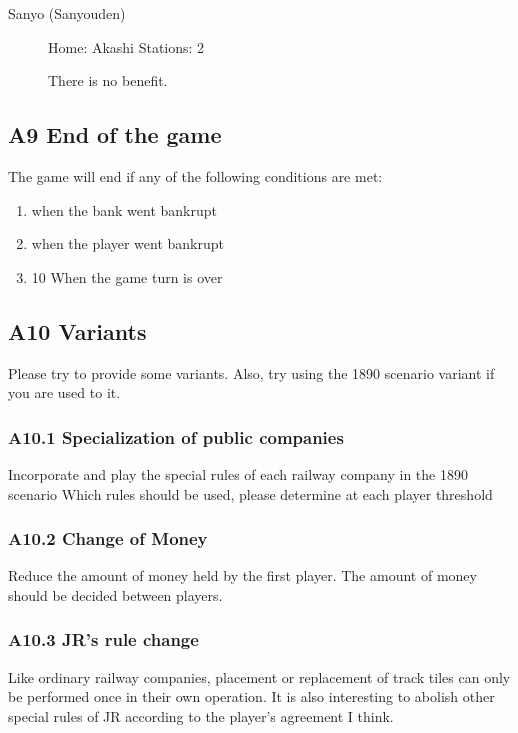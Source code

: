 \documentclass{article}
\begin{document}
\begin{CJK}{UTF8}{min}
\begin{description}
\item[Sanyo (Sanyouden)] Home: Akashi Stations: 2

There is no benefit.
\end{description}
\subsection*{A9 End of the game}

The game will end if any of the following conditions are met:
\begin{enumerate}
\item when the bank went bankrupt

\item when the player went bankrupt

\item 10 When the game turn is over
\end{enumerate}

\subsection*{A10 Variants}

Please try to provide some variants. Also, try using the 1890 scenario
variant if you are used to it.

\subsubsection*{A10.1 Specialization of public companies}

Incorporate and play the special rules of each railway company in the
1890 scenario Which rules should be used, please determine at each
player threshold

\subsubsection*{A10.2 Change of Money}

Reduce the amount of money held by the first player. The amount of
money should be decided between players.

\subsubsection*{A10.3 JR's rule change}

Like ordinary railway companies, placement or replacement of track
tiles can only be performed once in their own operation. It is also
interesting to abolish other special rules of JR according to the
player's agreement I think.


\end{CJK}
\end{document}
